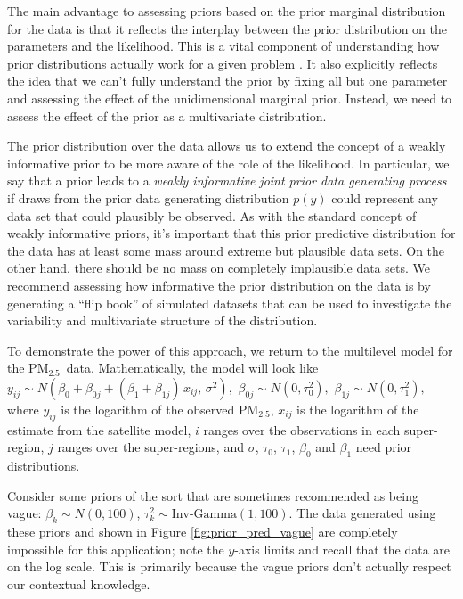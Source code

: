 \documentclass{statsoc}
\newcommand{\PM}{PM$_{2.5}$}
\begin{document}
The main advantage to assessing priors based on the prior marginal distribution
for the data is that it reflects the interplay between the prior distribution on
the parameters and the likelihood. This is a vital component of understanding
how prior distributions actually work for a given problem
\citep{gelman2017priors}. It also explicitly reflects the idea that we can't
fully understand the prior by fixing all but one parameter and assessing the
effect of the unidimensional marginal prior.  Instead, we need to assess the
effect of the prior as a multivariate distribution.

The prior distribution over the data allows us to extend the concept of a weakly
informative prior \citep{gelman2008weakly}  to be more aware of the role of the
likelihood. In particular, we say that a prior leads to a \emph{weakly
informative joint prior data generating process}  if draws from the prior data
generating distribution $p(y)$ could represent any data set that could plausibly
be observed.  As with the standard concept of weakly informative priors, it's
important that this prior predictive distribution for the data has at least some
mass around extreme but plausible data sets. On the other hand, there should be
no mass on completely implausible data sets. We recommend assessing  how
informative the prior distribution on the data is by generating a ``flip book''
of simulated datasets that can be used to investigate the variability and
multivariate structure of the distribution.

To demonstrate the power of this approach, we return to the multilevel model for
the \PM\ data. Mathematically, the model will look like
$y_{ij} \sim N(\beta_0 + \beta_{0j} + (\beta_1 + \beta_{1j}) \, x_{ij}, \, \sigma^2),$
$\beta_{0j}  \sim N(0, \tau_0^2),$
$\beta_{1j} \sim N(0, \tau_1^2),$ 
where $y_{ij}$ is the logarithm of the observed \PM, $x_{ij}$ is the logarithm
of the estimate from the satellite model, $i$ ranges over the observations in
each super-region, $j$ ranges over the super-regions, and $\sigma$, $\tau_0$,
$\tau_1$, $\beta_0$ and $\beta_1$ need prior distributions.

Consider some priors of the sort that are sometimes recommended as being vague:
$\beta_k \sim N(0,100)$, $\tau_k^2 \sim \text{Inv-Gamma}(1,100)$. The data
generated using these priors and shown in Figure \ref{fig:prior_pred_vague} are
completely impossible for this application; note the $y$-axis limits and recall
that the data are on the log scale.  This is primarily because the vague priors
don't actually respect our contextual knowledge.
\end{document}

